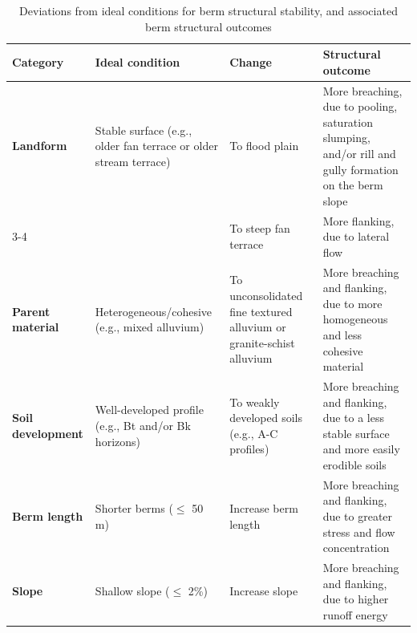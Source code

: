 \documentclass[review]{elsarticle}
\begin{document}
\begin{table}[h!]
\centering
\caption{\normalsize Deviations from ideal conditions for berm structural stability, and associated berm structural outcomes}
\small
\begin{tabular}{|p{3 cm}|p{3.5cm}|p{3.5cm}|p{4cm}|}
\hline
\textbf{Category} & \textbf{Ideal condition} & \textbf{Change} & \textbf{Structural outcome } \\
\hline
\textbf{Landform} & Stable surface (e.g., older fan terrace or older stream terrace) & To flood plain & More breaching, due to pooling, saturation slumping, and/or rill and gully formation on the berm slope\\
\cline{3-4}
 & & To steep fan terrace & More flanking, due to lateral flow \\
\hline
\textbf{Parent material} & Heterogeneous/cohesive (e.g., mixed alluvium) & To unconsolidated fine textured alluvium or granite-schist alluvium & More breaching and flanking, due to more homogeneous and less cohesive material \\
\hline
\textbf{Soil development} & Well-developed profile (e.g., Bt and/or Bk horizons) & To weakly developed soils (e.g., A-C profiles) & More breaching and flanking, due to a less stable surface and more easily erodible soils \\
\hline
\textbf{Berm length} & Shorter berms ($\leq$ 50 m) & Increase berm length & More breaching and flanking, due to greater stress and flow concentration \\
\hline
\textbf{Slope} & Shallow slope ($\leq$ 2\%) & Increase slope & More breaching and flanking, due to higher runoff energy \\
\hline
\end{tabular}
\label{tab:berm_outcomes}
\end{table}
\end{document}
